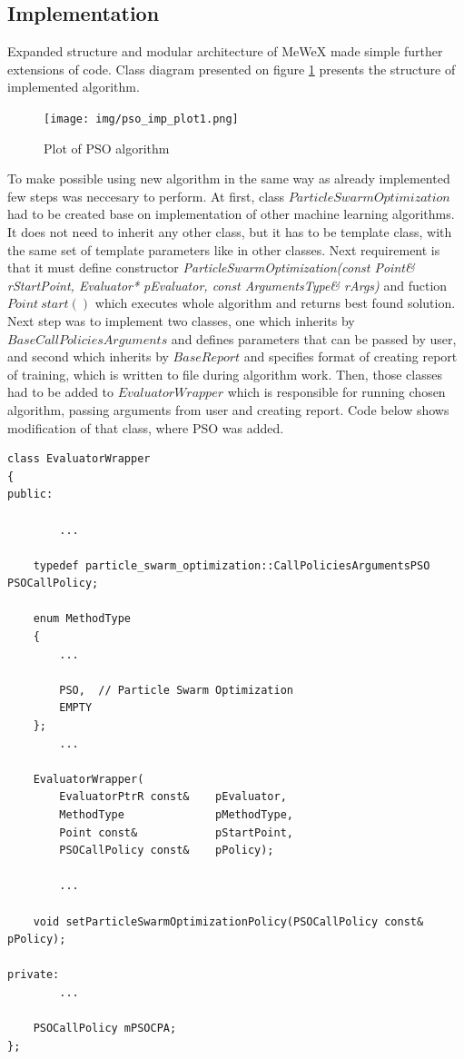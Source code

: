 \subsection{Implementation}
Expanded structure and modular architecture of MeWeX made simple further extensions of code. Class diagram presented on figure \ref{img_pso_class}
presents the structure of implemented algorithm.
\begin{figure}[ht]
\centering
    \texttt{[image: img/pso\_imp\_plot1.png]}
    \caption{Plot of PSO algorithm }
    \label{img_pso_class}
\end{figure}


To make possible using new algorithm in the same way as already implemented few steps was neccesary to perform.
At first, class \(ParticleSwarmOptimization\) had to be created base on implementation of other machine learning algorithms. 
It does not need to inherit any other class, but it has to be template class, with the same set of template parameters like in other classes. 
Next requirement is that it must define constructor \textit{ParticleSwarmOptimization(const Point\& rStartPoint, Evaluator* pEvaluator, const ArgumentsType\& rArgs)} 
and fuction \(Point\ start()\) which executes whole algorithm and returns best found solution.
Next step was to implement two classes, one which inherits by \(BaseCallPoliciesArguments\) and defines parameters that can be passed by user, 
and second which inherits by \(BaseReport\) and specifies format of creating report of training, which is written to file during algorithm work.
Then, those classes had to be added to \(EvaluatorWrapper\) which is responsible for running chosen algorithm, 
passing arguments from user and creating report. Code below shows modification of that class, where PSO was added.
\begin{lstlisting}
class EvaluatorWrapper
{
public:

        ...

    typedef particle_swarm_optimization::CallPoliciesArgumentsPSO	PSOCallPolicy;

    enum MethodType
    {
        ...

        PSO,  // Particle Swarm Optimization
        EMPTY
    };
        ...

    EvaluatorWrapper(
        EvaluatorPtrR const&	pEvaluator,
        MethodType              pMethodType,
        Point const&	        pStartPoint,
        PSOCallPolicy const& 	pPolicy);

        ...
    
    void setParticleSwarmOptimizationPolicy(PSOCallPolicy const& pPolicy);

private:
        ...
    
    PSOCallPolicy mPSOCPA;
};
\end{lstlisting}
    
